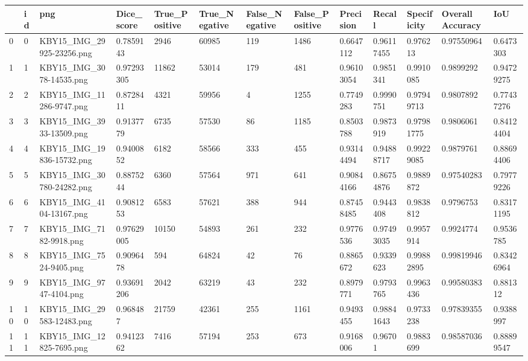 \documentclass[11pt, a4paper, twoside]{report}
\begin{document}
\begin{longtable}[c]{@{}lllllllllllll@{}}
\toprule
 & id & png & Dice\_score & True\_Positive & True\_Negative & False\_Negative & False\_Positive & Precision & Recall & Specificity & Overall Accuracy & IoU \\* \midrule
\endhead
%
\bottomrule
\endfoot
%
\endlastfoot
%
0 & 0 & KBY15\_IMG\_29925-23256.png & 0.7859143 & 2946 & 60985 & 119 & 1486 & 0.6647112 & 0.96117455 & 0.976213 & 0.97550964 & 0.6473303 \\
1 & 1 & KBY15\_IMG\_3078-14535.png & 0.97293305 & 11862 & 53014 & 179 & 481 & 0.96103054 & 0.9851341 & 0.9910085 & 0.9899292 & 0.94729275 \\
2 & 2 & KBY15\_IMG\_11286-9747.png & 0.8728411 & 4321 & 59956 & 4 & 1255 & 0.7749283 & 0.9990751 & 0.97949713 & 0.9807892 & 0.77437276 \\
3 & 3 & KBY15\_IMG\_3933-13509.png & 0.9137779 & 6735 & 57530 & 86 & 1185 & 0.8503788 & 0.9873919 & 0.97981775 & 0.9806061 & 0.84124404 \\
4 & 4 & KBY15\_IMG\_19836-15732.png & 0.9400852 & 6182 & 58566 & 333 & 455 & 0.93144494 & 0.94888717 & 0.99229085 & 0.9879761 & 0.88694406 \\
5 & 5 & KBY15\_IMG\_30780-24282.png & 0.8875244 & 6360 & 57564 & 971 & 641 & 0.90844166 & 0.86754876 & 0.9889872 & 0.97540283 & 0.79779226 \\
6 & 6 & KBY15\_IMG\_4104-13167.png & 0.9081253 & 6583 & 57621 & 388 & 944 & 0.87458485 & 0.9443408 & 0.9838812 & 0.9796753 & 0.83171195 \\
7 & 7 & KBY15\_IMG\_7182-9918.png & 0.97629005 & 10150 & 54893 & 261 & 232 & 0.9776536 & 0.97493035 & 0.9957914 & 0.9924774 & 0.9536785 \\
8 & 8 & KBY15\_IMG\_7524-9405.png & 0.9096478 & 594 & 64824 & 42 & 76 & 0.8865672 & 0.9339623 & 0.99882895 & 0.99819946 & 0.83426964 \\
9 & 9 & KBY15\_IMG\_9747-4104.png & 0.93691206 & 2042 & 63219 & 43 & 232 & 0.8979771 & 0.9793765 & 0.9963436 & 0.99580383 & 0.881312 \\
10 & 10 & KBY15\_IMG\_29583-12483.png & 0.968487 & 21759 & 42361 & 255 & 1161 & 0.9493455 & 0.98841643 & 0.9733238 & 0.97839355 & 0.9388997 \\
11 & 11 & KBY15\_IMG\_12825-7695.png & 0.9412362 & 7416 & 57194 & 253 & 673 & 0.9168006 & 0.96701 & 0.9883699 & 0.98587036 & 0.88899547 \\

\end{longtable}
\end{document}
